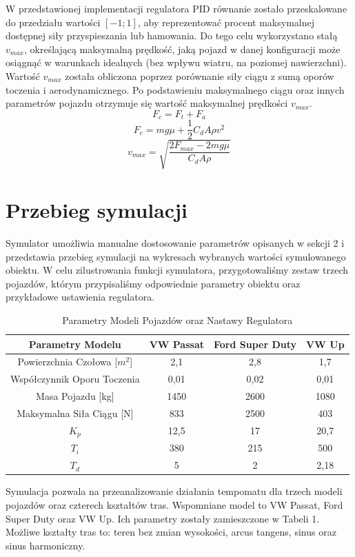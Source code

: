 \documentclass[12pt,a4paper]{article}
\begin{document}
 	W przedstawionej implementacji regulatora PID równanie zostało przeskalowane do przedziału wartości $[-1; 1]$, aby reprezentować procent maksymalnej dostępnej siły przyspieszania lub hamowania. Do tego celu wykorzystano stałą $v_{max}$, określającą maksymalną prędkość, jaką pojazd w danej konfiguracji może osiągnąć w warunkach idealnych (bez wpływu wiatru, na poziomej nawierzchni). Wartość $v_{max}$ została obliczona poprzez porównanie siły ciągu z sumą oporów toczenia i aerodynamicznego. Po podstawieniu maksymalnego ciągu oraz innych parametrów pojazdu otrzymuje się wartość maksymalnej prędkości $v_{max}$.
 	\[
 		F_{c} = F_{t} + F_{a}
 	\]	
 	\[
 		F_{c} = mg\mu + \frac{1}{2}C_{d}A\rho v^2
 	\]
 	\[
 		v_{max} = \sqrt{\frac{2F_{max} - 2mg\mu}{C_{d}A\rho}}
 	\]
	\section{Przebieg symulacji}
	Symulator umożliwia manualne dostosowanie parametrów opisanych w sekcji 2 i przedstawia przebieg symulacji na wykresach wybranych wartości symulowanego obiektu. W celu zilustrowania funkcji symulatora, przygotowaliśmy zestaw trzech pojazdów, którym przypisaliśmy odpowiednie parametry obiektu oraz przykładowe ustawienia regulatora.
	
 	\begin{table}[h]
		\centering
		\begin{tabular}{|c|c|c|c|}
			\hline
			Parametry Modelu & VW Passat & Ford Super Duty & VW Up \\
			\hline
			\hline
			Powierzchnia Czołowa [$m^2$] & 2,1 & 2,8 & 1,7 \\
			\hline
			Współczynnik Oporu Toczenia & 0,01 & 0,02 & 0,01 \\
			\hline
			Masa Pojazdu [kg] & 1450 & 2600 & 1080 \\
			\hline
			Maksymalna Siła Ciągu [N] & 833 & 2500 & 403 \\
			\hline
			$K_p$ & 12,5 & 17 & 20,7 \\
			\hline
			$T_i$ & 380 & 215 & 500 \\
			\hline
			$T_d$ & 5 & 2 & 2,18 \\
			\hline
		\end{tabular}
		\caption{Parametry Modeli Pojazdów oraz Nastawy Regulatora }
		\label{tab:transposed_vehicle_parameters}
	\end{table}
	Symulacja pozwala na przeanalizowanie działania tempomatu dla trzech modeli pojazdów oraz czterech kształtów tras. Wspomniane model to VW Passat, Ford Super Duty oraz VW Up. Ich parametry zostały zamieszczone w Tabeli 1.
	Możliwe kształty tras to: teren bez zmian wysokości, arcus tangens, sinus oraz sinus harmoniczny.
\end{document}
